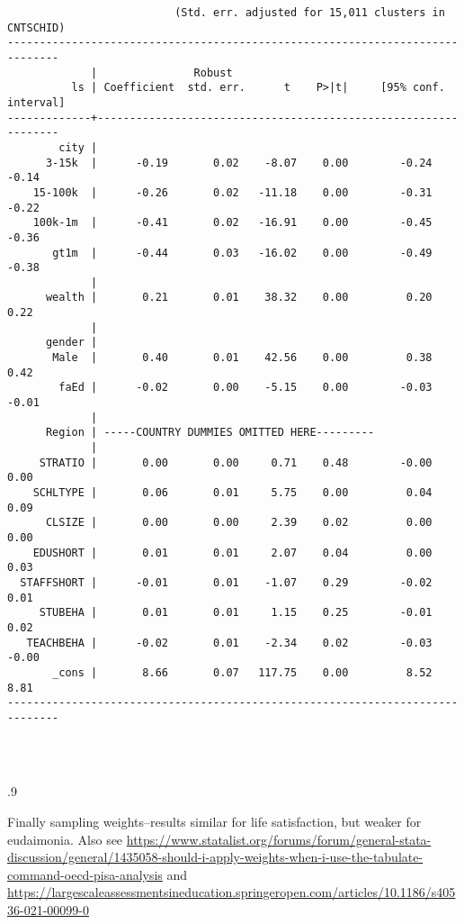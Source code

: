 \documentclass[10pt, letterpaper]{article}
\begin{document}
\begin{spacing}{1.4}
\begin{spacing}{.5}
\begin{scriptsize}
\begin{verbatim}
                          (Std. err. adjusted for 15,011 clusters in CNTSCHID)
------------------------------------------------------------------------------
             |               Robust
          ls | Coefficient  std. err.      t    P>|t|     [95% conf. interval]
-------------+----------------------------------------------------------------
        city |
      3-15k  |      -0.19       0.02    -8.07    0.00        -0.24       -0.14
    15-100k  |      -0.26       0.02   -11.18    0.00        -0.31       -0.22
    100k-1m  |      -0.41       0.02   -16.91    0.00        -0.45       -0.36
       gt1m  |      -0.44       0.03   -16.02    0.00        -0.49       -0.38
             |
      wealth |       0.21       0.01    38.32    0.00         0.20        0.22
             |
      gender |
       Male  |       0.40       0.01    42.56    0.00         0.38        0.42
        faEd |      -0.02       0.00    -5.15    0.00        -0.03       -0.01
             |
      Region | -----COUNTRY DUMMIES OMITTED HERE---------
             |
     STRATIO |       0.00       0.00     0.71    0.48        -0.00        0.00
    SCHLTYPE |       0.06       0.01     5.75    0.00         0.04        0.09
      CLSIZE |       0.00       0.00     2.39    0.02         0.00        0.00
    EDUSHORT |       0.01       0.01     2.07    0.04         0.00        0.03
  STAFFSHORT |      -0.01       0.01    -1.07    0.29        -0.02        0.01
     STUBEHA |       0.01       0.01     1.15    0.25        -0.01        0.02
   TEACHBEHA |      -0.02       0.01    -2.34    0.02        -0.03       -0.00
       _cons |       8.66       0.07   117.75    0.00         8.52        8.81
------------------------------------------------------------------------------




\end{verbatim}
\end{scriptsize}
\end{spacing}{.9}

Finally sampling weights--results similar for life satisfaction, but weaker for
 eudaimonia. Also see
\url{https://www.statalist.org/forums/forum/general-stata-discussion/general/1435058-should-i-apply-weights-when-i-use-the-tabulate-command-oecd-pisa-analysis}
and \url{https://largescaleassessmentsineducation.springeropen.com/articles/10.1186/s40536-021-00099-0}

\begin{spacing}{.5}
\begin{scriptsize}
\begin{verbatim}


\end{verbatim}
\end{scriptsize}
\end{spacing}
\end{spacing}
\end{document}
